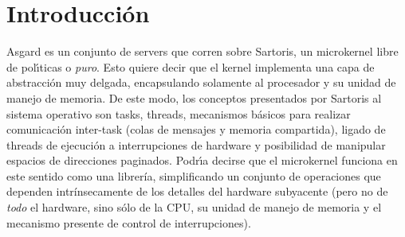 \documentclass[11pt, letterpaper, twoside]{book}
\begin{document}
\tableofcontents

\mainmatter

\chapter{Introducci\'on}

Asgard es un conjunto de servers que corren sobre Sartoris, un microkernel libre de pol\'\i{}ticas o \emph{puro}. Esto quiere decir que el kernel implementa una capa de abstracci\'on muy delgada, encapsulando solamente al procesador y su unidad de manejo de memoria. De este modo, los conceptos presentados por Sartoris al sistema operativo son tasks, threads, mecanismos b\'asicos para realizar comunicaci\'on inter-task (colas de mensajes y memoria compartida), ligado de threads de ejecuci\'on a interrupciones de hardware y posibilidad de manipular espacios de direcciones paginados. Podr\'\i{}a decirse que el microkernel funciona en este sentido como una librer\'ia, simplificando un conjunto de operaciones que dependen intr\'insecamente de los detalles del hardware subyacente (pero no de \emph{todo} el hardware, sino s\'olo de la CPU, su unidad de manejo de memoria y el mecanismo presente de control de interrupciones). 
\end{document}
